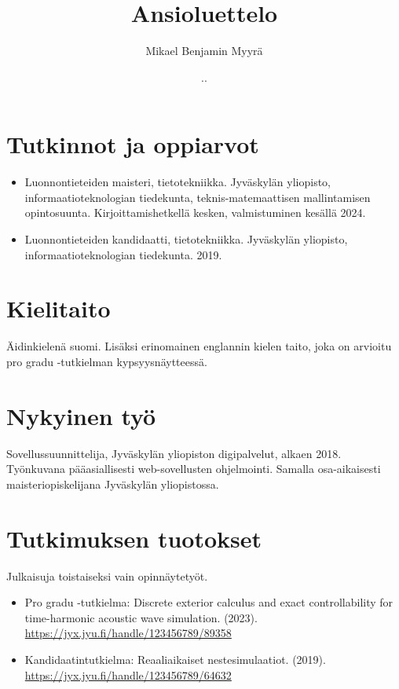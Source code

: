 \documentclass{article}
\title{Ansioluettelo}
\author{Mikael Benjamin Myyrä}
\date{\number\day.\number\month.\number\year}
\begin{document}
\maketitle

\section*{Tutkinnot ja oppiarvot}

\begin{itemize}
  \item Luonnontieteiden maisteri, tietotekniikka.
    Jyväskylän yliopisto, informaatioteknologian tiedekunta,
    teknis-matemaattisen mallintamisen opintosuunta.
    Kirjoittamishetkellä kesken, valmistuminen kesällä 2024.
  \item Luonnontieteiden kandidaatti, tietotekniikka.
    Jyväskylän yliopisto, informaatioteknologian tiedekunta.
    2019.
\end{itemize}

\section*{Kielitaito}

Äidinkielenä suomi. Lisäksi erinomainen englannin kielen taito,
joka on arvioitu pro gradu -tutkielman kypsyysnäytteessä.

\section*{Nykyinen työ}

Sovellussuunnittelija, Jyväskylän yliopiston digipalvelut, alkaen 2018.
Työnkuvana pääasiallisesti web-sovellusten ohjelmointi.
Samalla osa-aikaisesti maisteriopiskelijana Jyväskylän yliopistossa.

\section*{Tutkimuksen tuotokset}

Julkaisuja toistaiseksi vain opinnäytetyöt.
\begin{itemize}
  \item Pro gradu -tutkielma:
    Discrete exterior calculus and exact controllability
    for time-harmonic acoustic wave simulation. (2023).
    \url{https://jyx.jyu.fi/handle/123456789/89358}
  \item Kandidaatintutkielma:
    Reaaliaikaiset nestesimulaatiot. (2019).
    \url{https://jyx.jyu.fi/handle/123456789/64632}
\end{itemize}
\end{document}
